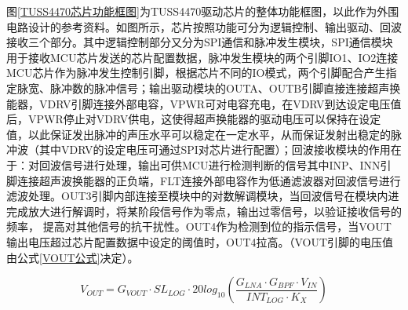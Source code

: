  图\ref{TUSS4470芯片功能框图}为TUSS4470驱动芯片的整体功能框图，以此作为外围电路设计的参考资料。如图所示，芯片按照功能可分为逻辑控制、输出驱动、回波接收三个部分。其中逻辑控制部分又分为SPI通信和脉冲发生模块，SPI通信模块用于接收MCU芯片发送的芯片配置数据，脉冲发生模块的两个引脚IO1、IO2连接MCU芯片作为脉冲发生控制引脚，根据芯片不同的IO模式，两个引脚配合产生指定脉宽、脉冲数的脉冲信号；输出驱动模块的OUTA、OUTB引脚直接连接超声换能器，VDRV引脚连接外部电容，VPWR可对电容充电，在VDRV到达设定电压值后，VPWR停止对VDRV供电，这使得超声换能器的驱动电压可以保持在设定值，以此保证发出脉冲的声压水平可以稳定在一定水平，从而保证发射出稳定的脉冲波（其中VDRV的设定电压可通过SPI对芯片进行配置）；回波接收模块的作用在于：对回波信号进行处理，输出可供MCU进行检测判断的信号其中INP、INN引脚连接超声波换能器的正负端，FLT连接外部电容作为低通滤波器对回波信号进行滤波处理。OUT3引脚内部连接至模块中的对数解调模块，当回波信号在模块内进完成放大进行解调时，将某阶段信号作为零点，输出过零信号，以验证接收信号的频率， 提高对其他信号的抗干扰性。OUT4作为检测到位的指示信号，当VOUT输出电压超过芯片配置数据中设定的阈值时，OUT4拉高。（VOUT引脚的电压值由公式\ref{VOUT公式}决定）。
    
    \begin{equation}
        V_{OUT}=G_{VOUT} \cdot SL_{LOG}\cdot20log_{10}(\frac{G_{LNA} \cdot G_{BPF} \cdot V_{IN}}{INT_{LOG} \cdot K_X})
        \label{VOUT公式}
    \end{equation}

